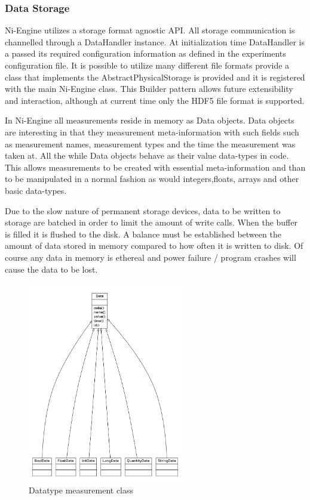 \subsubsection{Data Storage}
Ni-Engine utilizes a storage format agnostic API. All storage communication is channelled through a DataHandler instance. At initialization time DataHandler is a passed its required configuration information as defined in the experiments configuration file. It is possible to utilize many different file formats provide a class that implements the AbstractPhysicalStorage is provided and it is registered with the main Ni-Engine class. This Builder pattern allows future extensibility and interaction, although at current time only the HDF5 file format is supported. 

In Ni-Engine all measurements reside in memory as Data objects. Data objects are interesting in that they measurement meta-information with such fields such as measurement names, measurement types and the time the measurement was taken at. All the while Data objects behave as their value data-types in code. This allows measurements to be created with essential meta-information and than to be manipulated in a normal fashion as would integers,floats, arrays and other basic data-types. 

Due to the slow nature of permanent storage devices, data to be written to storage are batched in order to limit the amount of write calls. When the buffer is filled it is flushed to the disk. A balance must be established between the amount of data stored in memory compared to how often it is written to disk. Of course any data in memory is ethereal and power failure / program crashes will cause the data to be lost. 
\begin{figure}[ht!]
\centering
\includegraphics[width=0.6\textwidth]{Figures/datatypes.png}
\caption{Datatype measurement class}
\label{fig:datatypes}
\end{figure}
